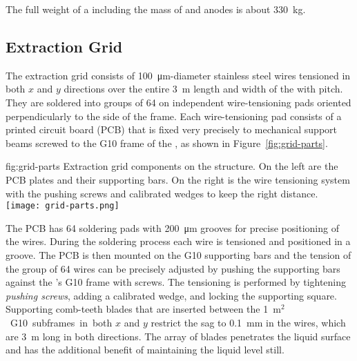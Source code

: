 The full weight of a  including the mass of  and anodes is about \SI{330}{kg}.

\subsection{Extraction Grid}
\label{sec:fddp-crp-grid}
The extraction grid consists of \SI{100}{\micro\meter}-diameter stainless steel wires tensioned in both $x$ and $y$ directions over the entire \SI{3}{m} length and width of the  with \dpstrippitch pitch. They are soldered into groups of \num{64} on independent wire-tensioning pads oriented perpendicularly to the side of the  frame. Each wire-tensioning pad consists of a printed circuit board (PCB)  that is fixed very precisely to mechanical support beams screwed to the G10 frame of the , as shown in Figure~\ref{fig:grid-parts}.
 
\begin{dunefigure}{fig:grid-parts}
{Extraction grid components on the  structure. On the left are the PCB plates and their supporting bars. On the right is the %
wire tensioning system with the pushing screws and calibrated wedges to keep the right distance.}
\texttt{[image: grid-parts.png]}
\end{dunefigure}

The PCB has \num{64} soldering pads with \SI{200}{\micro\meter} grooves for precise positioning of the wires. During the %
soldering process each wire is tensioned and positioned in a groove. The PCB is then mounted on the G10 supporting bars and the tension of the group of \num{64} wires can be precisely adjusted by pushing the supporting bars against the ’s G10 frame with screws. The tensioning is performed by tightening \textit{pushing screws}, adding a calibrated wedge, and locking the supporting square.
Supporting comb-teeth blades that are inserted between the \SI{1}{m$^2$} G10 subframes in both $x$ and $y$ restrict the sag to \SI{0.1}{mm} in the wires, which are \SI{3}{m} long in both directions. The array of blades penetrates the liquid surface and has the additional benefit of maintaining the liquid level still.

